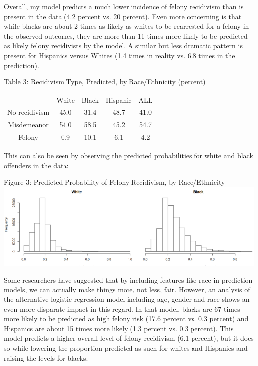 \documentclass{article}
\begin{document}
Overall, my model predicts a much lower incidence of felony recidivism than is present in the data (4.2 percent vs. 20 percent). Even more concerning is that while blacks are about 2 times as likely as whites to be rearrested for a felony in the observed outcomes, they are more than 11 times more likely to be predicted as likely felony recidivists by the model. A similar but less dramatic pattern is present for Hispanics versus Whites (1.4 times in reality vs. 6.8 times in the prediction). 

\pagebreak
\begin{center}
Table 3: Recidivism Type, Predicted, by Race/Ethnicity (percent)
\begin{tabular}{ c c c c c }
  & White & Black & Hispanic & ALL \\ 
 No recidivism & 45.0 & 31.4 & 48.7 & 41.0 \\ 
 Misdemeanor & 54.0 & 58.5 & 45.2 & 54.7 \\ 
 Felony & 0.9 & 10.1 & 6.1 & 4.2\\ 
\end{tabular}
\end{center}

This can also be seen by observing the predicted probabilities for white and black offenders in the data:

\begin{center}
Figure 3: Predicted Probability of Felony Recidivism, by Race/Ethnicity
\includegraphics[scale=0.65]{histograms.PNG}
\end{center}

Some researchers have suggested that by including features like race in prediction models, we can actually make things more, not less, fair. However, an analysis of the alternative logistic regression model including age, gender and race shows an even more disparate impact in this regard. In that model, blacks are 67 times more likely to be predicted as high felony risk (17.6 percent vs. 0.3 percent) and Hispanics are about 15 times more likely (1.3 percent vs. 0.3 percent). This model predicts a higher overall level of felony recidivism (6.1 percent), but it does so while lowering the proportion predicted as such for whites and Hispanics and raising the levels for blacks. 
\end{document}
